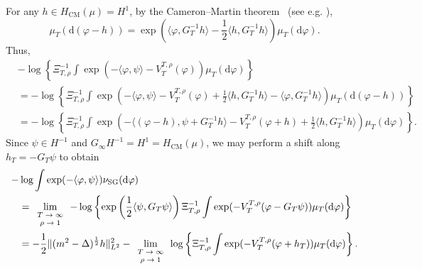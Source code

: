 \documentclass[11pt, a4paper]{scrartcl}
\numberwithin{equation}{section}
\theoremstyle{plain}
\theoremstyle{remark}
\newcommand{\mathd}{\mathrm{d}}
\newcommand{\tmop}[1]{\ensuremath{\operatorname{#1}}}
\newcommand{\tmscript}[1]{\text{\scriptsize{$#1$}}}
\begin{document}
For any $h \in H_{\tmop{CM}} (\mu) = H^1$, by the Cameron--Martin theorem \
(see e.g. {\cite[Corollary 2.4.3]{bogachevGaussianMeasures1998}}),
\[ \mu_T (\mathd (\varphi - h)) = \exp \left( \langle \varphi, G_T^{-1} h \rangle -
	\frac{1}{2} \langle h, G_T^{-1} h \rangle \right) \mu_T (\mathd \varphi) . \]
Thus,
\begin{equation*}
	\begin{aligned}
		 & -\log \left\{ \Xi_{T, \rho}^{- 1} \int \exp (- \langle \varphi, \psi
		\rangle - V_T^{T, \rho} (\varphi)) \mu_T (\mathd \varphi) \right\}              \\
		 & = - \log \left\{ \Xi_{T, \rho}^{- 1} \int \exp \left( - \langle \varphi,
		\psi \rangle - V_T^{T, \rho} (\varphi) + \frac{1}{2} \langle h, G_T^{-1}h
		\rangle - \langle \varphi, G_T^{-1}h \rangle \right) \mu_T (\mathd (\varphi -
		h)) \right\}                                                                    \\
		 & = - \log \left\{ \Xi_{T, \rho}^{- 1} \int \exp \left( - \langle (\varphi-h),
		\psi + G_T^{-1}h \rangle - V_T^{T, \rho}
		(\varphi + h) + \frac{1}{2} \langle h, G_T^{-1}h \rangle \right) \mu_T (\mathd
		\varphi) \right\}.
	\end{aligned}
\end{equation*}
Since $\psi\in H^{-1}$ and $G_\infty H^{-1}=H^{1}=H_{\tmop{CM}} (\mu)$,
we may perform a shift along $h_T = - G_T \psi$ to obtain
\begin{equation*}
	\begin{aligned}
		- & \log \int \exp (- \langle \varphi, \psi \rangle) \nu_{\tmop{SG}} (\mathd
		\varphi)                                                                                                                                                         \\
		  & = \lim_{\tmscript{\begin{array}{c}
					                      T \rightarrow \infty \\
					                      \rho \rightarrow 1
				                      \end{array}}} - \log \left\{ \exp \left( \frac{1}{2} \langle \psi, G_T \psi \rangle \right) \Xi_{T, \rho}^{- 1} \int \exp (- V_T^{T, \rho}
		(\varphi - G_T \psi)) \mu_T (\mathd \varphi) \right\}                                                                                                            \\
		  & = - \frac{1}{2} \| (m^2-\Delta)^{\frac{1}{2}}h\|_{L^2}^2
		- \lim_{\tmscript{\begin{array}{c}
					                  T \rightarrow \infty \\
					                  \rho \rightarrow 1
				                  \end{array}}}  \log \left\{
		\Xi_{T, \rho}^{- 1} \int \exp (- V_T^{T, \rho} (\varphi + h_T))
		\mu_T (\mathd \varphi) \right\}.
	\end{aligned}
\end{equation*}
\end{document}
